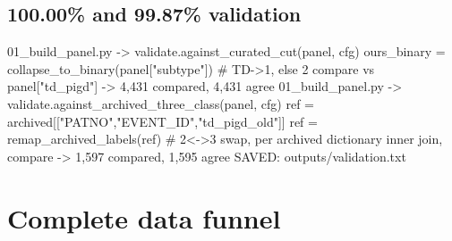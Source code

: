\documentclass[11pt,a4paper]{article}
\begin{document}
\subsection*{100.00\% and 99.87\% validation}
\begin{codeblock}
01_build_panel.py -> validate.against_curated_cut(panel, cfg)
  ours_binary = collapse_to_binary(panel["subtype"])   # TD->1, else 2
  compare vs panel["td_pigd"]        -> 4,431 compared, 4,431 agree
01_build_panel.py -> validate.against_archived_three_class(panel, cfg)
  ref = archived[["PATNO","EVENT_ID","td_pigd_old"]]
  ref = remap_archived_labels(ref)   # 2<->3 swap, per archived dictionary
  inner join, compare               -> 1,597 compared, 1,595 agree
  SAVED: outputs/validation.txt
\end{codeblock}

\section{Complete data funnel}
\end{document}

